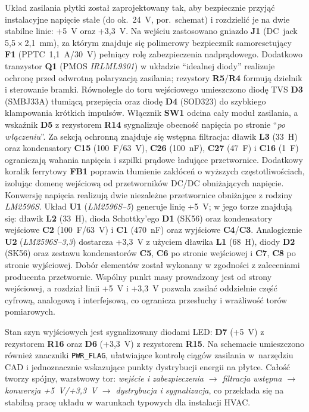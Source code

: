 Układ zasilania płytki został zaprojektowany tak, aby bezpiecznie przyjąć instalacyjne napięcie stałe (do ok.~24~V, por.\ schemat) i rozdzielić je na dwie stabilne linie: \mbox{+5~V} oraz \mbox{+3{,}3~V}. Na wejściu zastosowano gniazdo \textbf{J1} (DC~jack 5{,}5\,$\times$\,2{,}1~mm), za którym znajduje się polimerowy bezpiecznik samoresetujący \textbf{F1} (PPTC~1{,}1~A/30~V) pełniący rolę zabezpieczenia nadprądowego. Dodatkowo tranzystor \textbf{Q1} (PMOS \textit{IRLML9301}) w układzie ``idealnej diody'' realizuje ochronę przed odwrotną polaryzacją zasilania; rezystory \textbf{R5}/\textbf{R4} formują dzielnik i sterowanie bramki. Równolegle do toru wejściowego umieszczono diodę TVS \textbf{D3} (SMBJ33A) tłumiącą przepięcia oraz diodę \textbf{D4} (SOD323) do szybkiego klampowania krótkich impulsów. Włącznik \textbf{SW1} odcina cały moduł zasilania, a wskaźnik \textbf{D5} z rezystorem \textbf{R14} sygnalizuje obecność napięcia po stronie ``\emph{po włączeniu}''.
\newline
Za sekcją ochronną znajduje się wstępna filtracja: dławik \textbf{L3} (33~\textmu H) oraz kondensatory \textbf{C15} (100~\textmu F/63~V), \textbf{C26} (100~nF), \textbf{C27} (47~\textmu F) i \textbf{C16} (1~\textmu F) ograniczają wahania napięcia i szpilki prądowe ładujące przetwornice. Dodatkowy koralik ferrytowy \textbf{FB1} poprawia tłumienie zakłóceń o wyższych częstotliwościach, izolując domenę wejściową od przetworników DC/DC obniżających napięcie.
\newline
Konwersję napięcia realizują dwie niezależne przetwornice obniżające z rodziny \textit{LM2596S}. Układ \textbf{U1} (\textit{LM2596S--5}) generuje linię \mbox{+5~V}; w jego torze znajdują się: dławik \textbf{L2} (33~\textmu H), dioda Schottky’ego \textbf{D1} (SK56) oraz kondensatory wejściowe \textbf{C2} (100~\textmu F/63~V) i \textbf{C1} (470~nF) oraz wyjściowe \textbf{C4}/\textbf{C3}. Analogicznie \textbf{U2} (\textit{LM2596S--3{,}3}) dostarcza \mbox{+3{,}3~V} z użyciem dławika \textbf{L1} (68~\textmu H), diody \textbf{D2} (SK56) oraz zestawu kondensatorów \textbf{C5}, \textbf{C6} po stronie wejściowej i \textbf{C7}, \textbf{C8} po stronie wyjściowej. Dobór elementów został wykonany w zgodności z zaleceniami producenta przetwornic. Wspólny punkt masy prowadzony jest od strony wejściowej, a rozdział linii \mbox{+5~V} i \mbox{+3{,}3~V} pozwala zasilać oddzielnie część cyfrową, analogową i interfejsową, co ogranicza przesłuchy i wrażliwość torów pomiarowych.

Stan szyn wyjściowych jest sygnalizowany diodami LED: \textbf{D7} (\mbox{+5~V}) z rezystorem \textbf{R16} oraz \textbf{D6} (\mbox{+3{,}3~V}) z rezystorem \textbf{R15}. Na schemacie umieszczono również znaczniki \texttt{PWR\_FLAG}, ułatwiające kontrolę ciągów zasilania w~narzędziu CAD i jednoznacznie wskazujące punkty dystrybucji energii na płytce. Całość tworzy spójny, warstwowy tor: \emph{wejście i zabezpieczenia $\rightarrow$ filtracja wstępna $\rightarrow$ konwersja \mbox{+5~V}/\mbox{+3{,}3~V} $\rightarrow$ dystrybucja i sygnalizacja}, co przekłada się na stabilną pracę układu w warunkach typowych dla instalacji HVAC.




